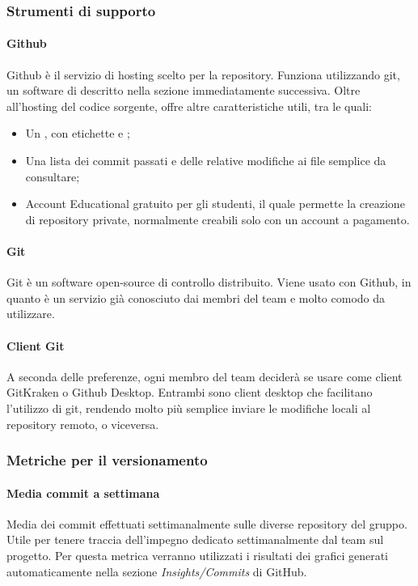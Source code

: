 \subsubsection{Strumenti di supporto}
\paragraph{Github}\Spazio
Github è il servizio di hosting scelto per la repository. Funziona utilizzando git, un software di  descritto nella sezione immediatamente successiva. Oltre all'hosting del codice sorgente, offre altre caratteristiche utili, tra le quali:
\begin{itemize}
	\item Un , con etichette e ;
	\item Una lista dei commit passati e delle relative modifiche ai file semplice da consultare;
	\item Account Educational gratuito per gli studenti, il quale permette la creazione di repository private, normalmente creabili solo con un account a pagamento.
\end{itemize}

\paragraph{Git}\Spazio
Git è un software open-source di controllo  distribuito.
Viene usato con Github, in quanto è un servizio già conosciuto dai membri del team e molto comodo da utilizzare.

\paragraph{Client Git}\Spazio
A seconda delle preferenze, ogni membro del team deciderà se usare come client GitKraken o Github Desktop. Entrambi sono client desktop che facilitano l'utilizzo di git, rendendo molto più semplice inviare le modifiche locali al repository remoto, o viceversa.

\subsubsection{Metriche per il versionamento}
\paragraph{Media commit a settimana} \Spazio
Media dei commit effettuati settimanalmente sulle diverse repository del gruppo. Utile per tenere traccia dell'impegno dedicato settimanalmente dal team sul progetto. Per questa metrica verranno utilizzati i risultati dei grafici generati automaticamente nella sezione \emph{Insights/Commits} di GitHub.


